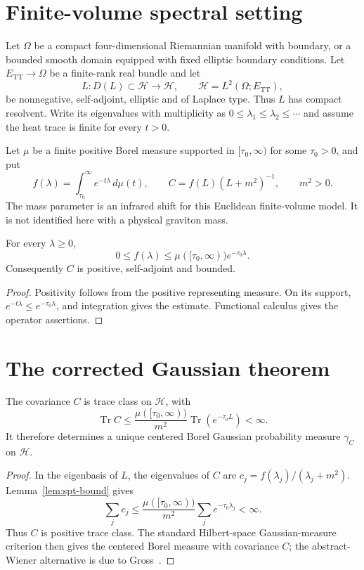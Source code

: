 \documentclass[11pt]{article}
\newcommand{\TT}{\mathrm{TT}}
\newcommand{\Tr}{\operatorname{Tr}}
\newcommand{\cH}{\mathcal{H}}
\begin{document}
\section{Finite-volume spectral setting}

Let $\Omega$ be a compact four-dimensional Riemannian manifold with boundary, or a
bounded smooth domain equipped with fixed elliptic boundary conditions. Let
$E_{\TT}\to\Omega$ be a finite-rank real bundle and let
\[
 L:D(L)\subset\cH\longrightarrow\cH,\qquad
 \cH=L^2(\Omega;E_{\TT}),
\]
be nonnegative, self-adjoint, elliptic and of Laplace type. Thus $L$ has compact
resolvent. Write its eigenvalues with multiplicity as
$0\leq\lambda_1\leq\lambda_2\leq\cdots$ and assume the heat trace is finite for
every $t>0$.

Let $\mu$ be a finite positive Borel measure supported in
$[\tau_0,\infty)$ for some $\tau_0>0$, and put
\[
 f(\lambda)=\int_{\tau_0}^{\infty}e^{-t\lambda}\,d\mu(t),
 \qquad
 C=f(L)(L+m^2)^{-1},\qquad m^2>0.
\]
The mass parameter is an infrared shift for this Euclidean finite-volume model. It
is not identified here with a physical graviton mass.

\begin{lemma}\label{lem:spt-bound}
For every $\lambda\geq0$,
\[
 0\leq f(\lambda)\leq \mu([\tau_0,\infty))e^{-\tau_0\lambda}.
\]
Consequently $C$ is positive, self-adjoint and bounded.
\end{lemma}

\begin{proof}
Positivity follows from the positive representing measure. On its support,
$e^{-t\lambda}\leq e^{-\tau_0\lambda}$, and integration gives the estimate.
Functional calculus gives the operator assertions.
\end{proof}

\section{The corrected Gaussian theorem}

\begin{theorem}\label{thm:trace}
The covariance $C$ is trace class on $\cH$, with
\[
 \Tr C\leq
 \frac{\mu([\tau_0,\infty))}{m^2}\Tr(e^{-\tau_0L})<\infty.
\]
It therefore determines a unique centered Borel Gaussian probability measure
$\gamma_C$ on $\cH$.
\end{theorem}

\begin{proof}
In the eigenbasis of $L$, the eigenvalues of $C$ are
$c_j=f(\lambda_j)/(\lambda_j+m^2)$. Lemma~\ref{lem:spt-bound} gives
\[
 \sum_jc_j\leq
 \frac{\mu([\tau_0,\infty))}{m^2}\sum_je^{-\tau_0\lambda_j}<\infty.
\]
Thus $C$ is positive trace class. The standard Hilbert-space Gaussian-measure
criterion then gives the centered Borel measure with covariance $C$; the
abstract-Wiener alternative is due to Gross~\cite{Gross1967}.
\end{proof}
\end{document}
